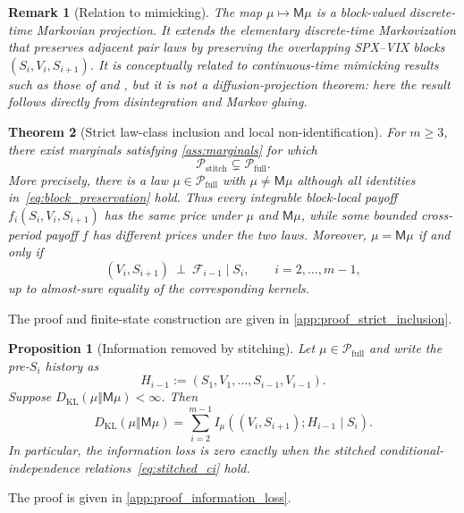 \documentclass{article}
\newtheorem{theorem}{Theorem}[section]
\newtheorem{proposition}{Proposition}[section]
\newtheorem{remark}[theorem]{Remark}
\newcommand{\cF}{\mathcal{F}}
\newcommand{\cP}{\mathcal{P}}
\begin{document}
\begin{remark}[Relation to mimicking]\label{rem:mimicking}
The map $\mu\mapsto\mathsf M\mu$ is a block-valued discrete-time Markovian projection.
It extends the elementary discrete-time Markovization that preserves adjacent pair laws by preserving the overlapping SPX--VIX blocks $(S_i,V_i,S_{i+1})$.
It is conceptually related to continuous-time mimicking results such as those of \citet{gyongy1986mimicking} and \citet{brunick2013mimicking}, but it is not a diffusion-projection theorem: here the result follows directly from disintegration and Markov gluing.
\end{remark}

\begin{theorem}[Strict law-class inclusion and local non-identification]
\label{thm:strict_inclusion}
For $m\geq3$, there exist marginals satisfying \cref{ass:marginals} for which
\begin{equation}
    \cP_{\mathrm{stitch}}\subsetneq\cP_{\mathrm{full}}.
\end{equation}
More precisely, there is a law $\mu\in\cP_{\mathrm{full}}$ with $\mu\neq\mathsf M\mu$ although all identities in~\eqref{eq:block_preservation} hold.
Thus every integrable block-local payoff $f_i(S_i,V_i,S_{i+1})$ has the same price under $\mu$ and $\mathsf M\mu$, while some bounded cross-period payoff $f$ has different prices under the two laws.
Moreover, $\mu=\mathsf M\mu$ if and only if
\begin{equation}\label{eq:stitched_ci}
    (V_i,S_{i+1})\ \perp\ \cF_{i-1}\mid S_i,
    \qquad i=2,\ldots,m-1,
\end{equation}
up to almost-sure equality of the corresponding kernels.
\end{theorem}
The proof and finite-state construction are given in \cref{app:proof_strict_inclusion}.

\begin{proposition}[Information removed by stitching]\label{prop:information_loss}
Let $\mu\in\cP_{\mathrm{full}}$ and write the pre-$S_i$ history as
\[
H_{i-1}:=(S_1,V_1,\ldots,S_{i-1},V_{i-1}).
\]
Suppose $D_{\mathrm{KL}}(\mu\Vert\mathsf M\mu)<\infty$.
Then
\begin{equation}\label{eq:information_loss}
D_{\mathrm{KL}}(\mu\Vert\mathsf M\mu)
=
\sum_{i=2}^{m-1}
I_\mu\!\left((V_i,S_{i+1});H_{i-1}\mid S_i\right).
\end{equation}
In particular, the information loss is zero exactly when the stitched conditional-independence relations~\eqref{eq:stitched_ci} hold.
\end{proposition}
The proof is given in \cref{app:proof_information_loss}.
\end{document}
